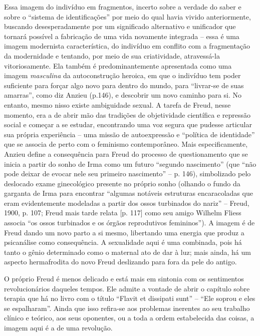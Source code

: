 Essa imagem do indivíduo em fragmentos, incerto sobre a verdade do saber
e sobre o ``sistema de identificações'' por meio do qual havia vivido
anteriormente, buscando desesperadamente por um significado alternativo
e unificador que tornará possível a fabricação de uma vida novamente
integrada -- essa é uma imagem modernista característica, do indivíduo
em conflito com a fragmentação da modernidade e tentando, por meio de
sua criatividade, atravessá-la vitoriosamente. Ela também é
predominantemente apresentada como uma imagem \emph{masculina} da
autoconstrução heroica, em que o indivíduo tem poder suficiente para
forçar algo novo para dentro do mundo, para ``livrar-se de suas
amarras'', como diz Anzieu (p.146), e descobrir um novo caminho para si.
No entanto, mesmo nisso existe ambiguidade sexual. A tarefa de Freud,
nesse momento, era a de abrir mão das tradições de objetividade
científica e repressão social e começar a se estudar, encontrando uma
voz segura que pudesse articular sua própria experiência -- uma missão
de autoexpressão e ``política de identidade'' que se associa de perto
com o feminismo contemporâneo. Mais especificamente, Anzieu define a
consequência para Freud do processo de questionamento que se inicia a
partir do sonho de Irma como um futuro ``segundo nascimento'' (que ``não
pode deixar de evocar nele seu primeiro nascimento'' -- p. 146),
simbolizado pelo deslocado exame ginecológico presente no próprio sonho
(olhando o fundo da garganta de Irma para encontrar ``algumas notáveis
estruturas encaracoladas que eram evidentemente modeladas a partir dos
ossos turbinados do nariz'' -- Freud, 1900, p. 107; Freud mais tarde
relata {[}p. 117{]} como seu amigo Wilhelm Fliess associa ``os ossos
turbinados e os órgãos reprodutivos femininos''). A imagem é de Freud
dando um novo parto a si mesmo, libertando uma energia que produz a
psicanálise como consequência. A sexualidade aqui é uma combinada, pois
há tanto o gênio determinado como o maternal ato de dar à luz; mais
ainda, há um aspecto hermafrodita do novo Freud deslizando para fora da
pele do antigo.

O próprio Freud é menos delicado e está mais em sintonia com os
sentimentos revolucionários daqueles tempos. Ele admite a vontade de
abrir o capítulo sobre terapia que há no livro com o título ``Flavit et
dissipati sunt'' -- ``Ele soprou e eles se espalharam''. Ainda que isso
refira-se aos problemas inerentes ao seu trabalho clínico e teórico, aos
seus oponentes, ou a toda a ordem estabelecida das coisas, a imagem aqui
é a de uma revolução.

